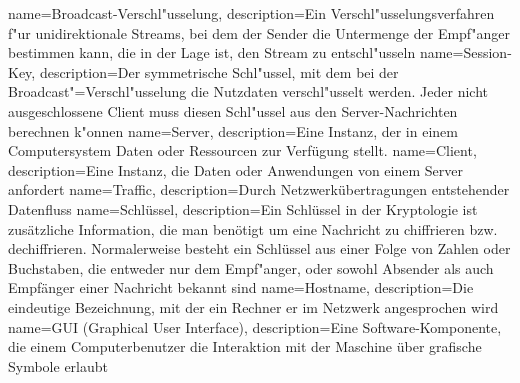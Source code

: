{
  name=Broadcast-Verschl"usselung,
  description={Ein Verschl"usselungsverfahren f"ur unidirektionale Streams, bei dem der
  Sender die Untermenge der Empf"anger bestimmen kann, die in der Lage ist, den Stream
  zu entschl"usseln}
}
{
  name=Session-Key,
  description={Der symmetrische Schl"ussel, mit dem bei der Broadcast"=Verschl"usselung die
  Nutzdaten verschl"usselt werden. Jeder nicht ausgeschlossene Client muss diesen Schl"ussel
  aus den Server-Nachrichten berechnen k"onnen}
}
{
  name=Server,
  description={Eine Instanz, der in einem Computersystem Daten oder Ressourcen zur Verfügung stellt.}
}
{
  name=Client,
  description={Eine Instanz, die Daten oder Anwendungen von einem Server anfordert}
}
{
  name=Traffic,
  description={Durch Netzwerkübertragungen entstehender Datenfluss}
}
{
  name=Schlüssel,
  description={Ein Schlüssel in der Kryptologie ist zusätzliche Information, die man benötigt um eine
	Nachricht zu chiffrieren bzw. dechiffrieren. Normalerweise besteht ein Schlüssel aus einer Folge von
	Zahlen oder Buchstaben, die entweder nur dem Empf"anger, oder sowohl Absender als auch Empfänger
        einer Nachricht bekannt sind}
}
{
  name=Hostname,
  description={Die eindeutige Bezeichnung, mit der ein Rechner er im Netzwerk angesprochen wird}
}
{
  name=GUI (Graphical User Interface),
  description={Eine Software-Komponente, die einem Computerbenutzer die Interaktion mit der Maschine
   über grafische Symbole erlaubt}
}

\renewcommand*{\glossaryname}{\section{\glossarName}}

\glsaddall
\printglossaries

